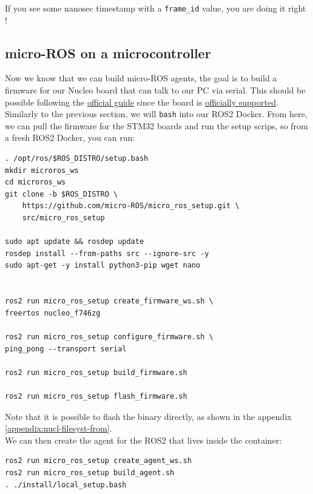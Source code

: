 \documentclass[10pt]{article}
\begin{document}
If you see some nanosec timestamp with a \verb|frame_id| value, you are doing it right !

\subsection{micro-ROS on a microcontroller}
\label{sec:micro-ros-micr}
Now we know that we can build micro-ROS agents, the goal is to build a firmware for our Nucleo board that can talk to our PC via serial.
This should be possible following the \href{https://micro.ros.org/docs/tutorials/core/first_application_rtos/freertos/}{official guide} since the board is \href{https://micro.ros.org/docs/overview/hardware/}{officially supported}.\\


Similarly to the previous section, we will \verb|bash| into our ROS2 Docker. From here, we can  pull the firmware for the STM32 boards and run the setup scrips, so from a fresh ROS2 Docker, you can run:
\begin{tcolorbox}
\begin{verbatim}
. /opt/ros/$ROS_DISTRO/setup.bash
mkdir microros_ws
cd microros_ws
git clone -b $ROS_DISTRO \
    https://github.com/micro-ROS/micro_ros_setup.git \
    src/micro_ros_setup

sudo apt update && rosdep update
rosdep install --from-paths src --ignore-src -y
sudo apt-get -y install python3-pip wget nano


ros2 run micro_ros_setup create_firmware_ws.sh \
freertos nucleo_f746zg

ros2 run micro_ros_setup configure_firmware.sh \
ping_pong --transport serial

ros2 run micro_ros_setup build_firmware.sh

ros2 run micro_ros_setup flash_firmware.sh
\end{verbatim}
\end{tcolorbox}
Note that it is possible to flash the binary directly, as shown in the appendix \ref{appendix:nucl-filesyst-from}.\\

We can then create the agent for the ROS2 that lives inside the container:
\begin{tcolorbox}
\begin{verbatim}
ros2 run micro_ros_setup create_agent_ws.sh
ros2 run micro_ros_setup build_agent.sh
. ./install/local_setup.bash
\end{verbatim}
\end{tcolorbox}
\end{document}

